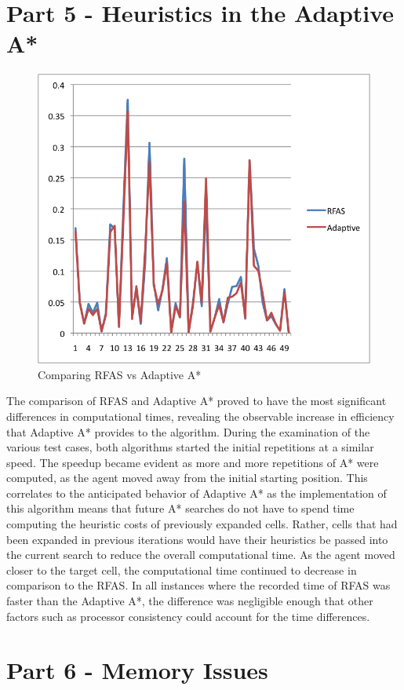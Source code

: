 \documentclass[12pt]{article}
\begin{document}
		
		
	\section*{Part 5 - Heuristics in the Adaptive A*}
		\begin{figure}[!htb]
			\centering
			\includegraphics[width=.5\textwidth]{foward_adaptive.png}
			\caption{Comparing RFAS vs Adaptive A*}
		\end{figure}
		The comparison of RFAS and Adaptive A* proved to have the most significant differences in computational times, revealing the observable increase in efficiency that Adaptive A* provides to the algorithm.  During the examination of the various test cases, both algorithms started the initial repetitions at a similar speed.  The speedup became evident as more and more repetitions of A* were computed, as the agent moved away from the initial starting position.  This correlates to the anticipated behavior of Adaptive A* as the implementation of this algorithm means that future A* searches do not have to spend time computing the heuristic costs of previously expanded cells.  Rather, cells that had been expanded in previous iterations would have their heuristics be passed into the current search to reduce the overall computational time.  As the agent moved closer to the target cell, the computational time continued to decrease in comparison to the RFAS.  In all instances where the recorded time of RFAS was faster than the Adaptive A*, the difference was negligible enough that other factors such as processor consistency could account for the time differences.  
	\section*{Part 6 - Memory Issues}
	\onecolumn
\end{document}
